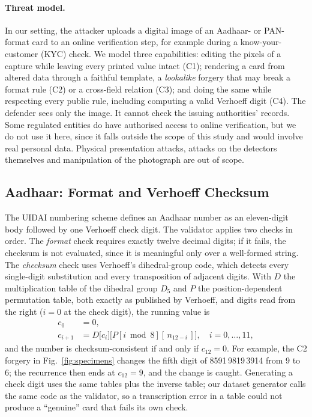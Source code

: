 \documentclass[VANCOUVER,Times1COL]{WileyNJDv5}
\begin{document}
\paragraph*{Threat model.} In our setting, the attacker uploads a digital image of an Aadhaar- or PAN-format card to an online verification step, for example during a know-your-customer (KYC) check. We model three capabilities: editing the
pixels of a capture while leaving every printed value intact (C1);
rendering a card from altered data through a faithful template, a
\emph{lookalike} forgery that may break a format rule (C2) or a
cross-field relation (C3); and doing the same while respecting every
public rule, including computing a valid Verhoeff digit (C4). The
defender sees only the image. It cannot check the issuing authorities' records. Some regulated entities do have authorised access to online verification, but we do not use it here, since it falls outside the scope of this study and would involve real personal data. Physical presentation attacks\cite{pad}, attacks on the
detectors themselves and manipulation of the photograph are out of
scope.

\subsection{Aadhaar: Format and Verhoeff Checksum}
\label{sec:aadhaar-validation}

The UIDAI numbering scheme defines an Aadhaar number as an eleven-digit
body followed by one Verhoeff check digit\cite{uidai-scheme}. The
validator applies two checks in order. The \emph{format} check requires
exactly twelve decimal digits; if it fails, the checksum is not
evaluated, since it is meaningful only over a well-formed string. The
\emph{checksum} check uses Verhoeff's dihedral-group code\cite{verhoeff},
which detects every single-digit substitution and every transposition
of adjacent digits. With $D$ the multiplication table of the dihedral
group $D_5$ and $P$ the position-dependent permutation table, both
exactly as published by Verhoeff\cite{verhoeff}, and digits read from the right
($i=0$ at the check digit), the running value is
\begin{equation}
\label{eq:verhoeff}
\begin{aligned}
c_0 &= 0,\\
c_{i+1} &= D\big[c_i\big]\big[P[i \bmod 8][\,n_{12-i}\,]\big],\quad i = 0,\dots,11,
\end{aligned}
\end{equation}
and the number is checksum-consistent if and only if $c_{12}=0$. For
example, the C2 forgery in Fig.~\ref{fig:specimens} changes the fifth
digit of 8591\,9819\,3914 from 9 to 6; the recurrence then ends at
$c_{12}=9$, and the change is caught. Generating a check digit uses the same tables plus the inverse table;
our dataset generator calls the same code as the validator, so a
transcription error in a table could not produce a ``genuine'' card that
fails its own check.
\end{document}
